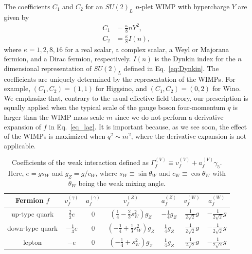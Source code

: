 \documentclass[12pt,twoside,book]{article}
\begin{document}
The coefficients $C_1$ and $C_2$ for an $SU(2)_L$ $n$-plet WIMP with hypercharge $Y$ are given by
\begin{align}
 C_1 &= \frac{\kappa}{8} n Y^2,\label{eq_C1}\\
 C_2 &= \frac{\kappa}{8} I(n),\label{eq_C2}
\end{align}
where $\kappa = 1, 2, 8, 16$ for a real scalar, a complex scalar, a Weyl or Majorana fermion, and a Dirac fermion, respectively.
$I(n)$ is the Dynkin index for the $n$ dimensional representation of $SU(2)_L$ defined in Eq.~\eqref{eq:Dynkin}.
The coefficients are uniquely determined by the representation of the WIMPs.
For example, $(C_1, C_2) = (1, 1)$ for Higgsino, and $(C_1, C_2) = (0, 2)$ for Wino.
We emphasize that, contrary to the usual effective field theory, our prescription is equally applied when the typical scale of the gauge boson four-momentum $q$ is larger than the WIMP mass scale $m$ since we do not perform a derivative expansion of $f$ in
Eq.~\eqref{eq_lag}.
It is important because, as we see soon, the effect of the WIMPs is maximized when $q^2\sim m^2$, where the derivative expansion is not applicable.

\begin{table}[t]
  \centering
  \def\arraystretch{1.2}
  \begin{tabular}{c|cccccc}
    Fermion $f$ & $v_f^{(\gamma)}$ & $a_f^{(\gamma)}$ & $v_f^{(Z)}$ & $a_f^{(Z)}$ & $v_f^{(W)}$ & $a_f^{(W)}$ \\ \hline
    up-type quark & $\frac{2}{3}e$ & 0 & $(\frac{1}{4}-\frac{2}{3}s_W^2) g_Z$ & $-\frac{1}{4}g_Z$ & $\frac{1}{2\sqrt{2}}g$ & $-\frac{1}{2\sqrt{2}}g$ \\
    down-type quark & $-\frac{1}{3}e$ & 0 & $(-\frac{1}{4}+\frac{1}{3}s_W^2)g_Z$ & $\frac{1}{4}g_Z$ & $\frac{1}{2\sqrt{2}}g$ & $-\frac{1}{2\sqrt{2}}g$ \\
    lepton & $-e$ & 0 & $(-\frac{1}{4}+s_W^2)g_Z$ & $\frac{1}{4}g_Z$ & $\frac{1}{2\sqrt{2}}g$ & $-\frac{1}{2\sqrt{2}}g$ \\
  \end{tabular}
  \caption{Coefficients of the weak interaction defined as
    $\Gamma_f^{(V)} \equiv v_f^{(V)} + a_f^{(V)} \gamma_5$.  Here, $e = g
    s_W$ and $g_Z = g / c_W$, where $s_W \equiv \sin \theta_W$ and $c_W
    \equiv \cos \theta_W$ with $\theta_W$ being the weak mixing angle.}
  \label{table_weak}
\end{table}
\end{document}
